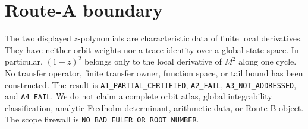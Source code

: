 \documentclass[10pt]{article}
\begin{document}
\section{Route-A boundary}
The two displayed $z$-polynomials are characteristic data of finite local
derivatives.  They have neither orbit weights nor a trace identity over a
global state space.  In particular, $(1+z)^2$ belongs only to the local
derivative of $M^2$ along one cycle.  No transfer operator, finite transfer
owner, function space, or tail bound has been constructed.  The result is
\texttt{A1\_PARTIAL\_CERTIFIED}, \texttt{A2\_FAIL},
\texttt{A3\_NOT\_ADDRESSED}, and \texttt{A4\_FAIL}.  We do not claim a
complete orbit atlas, global integrability classification, analytic Fredholm
determinant, arithmetic data, or Route-B object.  The scope firewall is
\texttt{NO\_BAD\_EULER\_OR\_ROOT\_NUMBER}.
\end{document}
